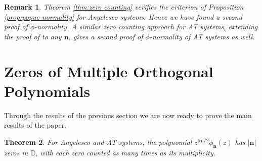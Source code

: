 \documentclass[reqno,centertags,11pt,draft]{amsart}
\newtheorem{thm}{Theorem}[section]
\newtheorem{rem}[thm]{Remark}
\newcommand{\D}{\mathbb{D}}
\newcommand{\abs}[1]{\left|#1\right|}
\begin{document}
\begin{rem}
    Theorem \ref{thm:zero counting} verifies the criterion of Proposition \ref{prop:popuc normality} for Angelesco systems. Hence we have found a second proof of $\phi$-normality. A similar zero counting approach for AT systems, extending the proof of \cite{Mil} to any $\bm{n}$, gives a second proof of $\phi$-normality of AT systems as well. 
\end{rem}

\section{Zeros of Multiple Orthogonal Polynomials}\label{zeros of mopuc section}

Through the results of the previous section we are now ready to prove the main results of the paper. 

\begin{thm}\label{thm:zeros in unit disc}
    For Angelesco and AT systems, the polynomial $z^{\abs{\bm{n}}/2}\phi_{\bm{n}}(z)$ has $\abs{\bm{n}}$ zeros in $\D$, with each zero counted as many times as its multiplicity. 
\end{thm}

\end{document}

